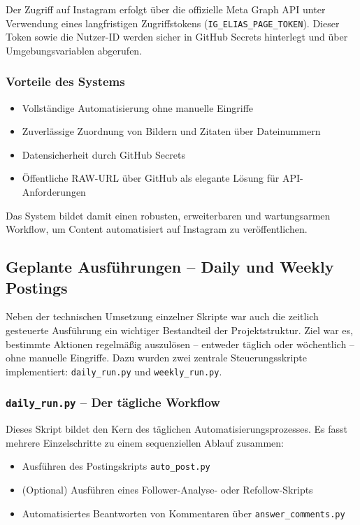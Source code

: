 \documentclass[a4paper,12pt]{article}
\begin{document}
Der Zugriff auf Instagram erfolgt über die offizielle Meta Graph API unter Verwendung eines langfristigen Zugriffstokens (\texttt{IG\_ELIAS\_PAGE\_TOKEN}). Dieser Token sowie die Nutzer-ID werden sicher in GitHub Secrets hinterlegt und über Umgebungsvariablen abgerufen.

\subsubsection*{Vorteile des Systems}

\begin{itemize}
    \item Vollständige Automatisierung ohne manuelle Eingriffe
    \item Zuverlässige Zuordnung von Bildern und Zitaten über Dateinummern
    \item Datensicherheit durch GitHub Secrets
    \item Öffentliche RAW-URL über GitHub als elegante Lösung für API-Anforderungen
\end{itemize}

Das System bildet damit einen robusten, erweiterbaren und wartungsarmen Workflow, um Content automatisiert auf Instagram zu veröffentlichen.
\clearpage
\subsection{Geplante Ausführungen – Daily und Weekly Postings}

Neben der technischen Umsetzung einzelner Skripte war auch die zeitlich gesteuerte Ausführung ein wichtiger Bestandteil der Projektstruktur. Ziel war es, bestimmte Aktionen regelmäßig auszulösen – entweder täglich oder wöchentlich – ohne manuelle Eingriffe. Dazu wurden zwei zentrale Steuerungsskripte implementiert: \texttt{daily\_run.py} und \texttt{weekly\_run.py}.

\subsubsection*{\texttt{daily\_run.py} – Der tägliche Workflow}

Dieses Skript bildet den Kern des täglichen Automatisierungsprozesses. Es fasst mehrere Einzelschritte zu einem sequenziellen Ablauf zusammen:

\begin{itemize}
    \item Ausführen des Postingskripts \texttt{auto\_post.py}
    \item (Optional) Ausführen eines Follower-Analyse- oder Refollow-Skripts
    \item Automatisiertes Beantworten von Kommentaren über \texttt{answer\_comments.py}
\end{itemize}
\end{document}
